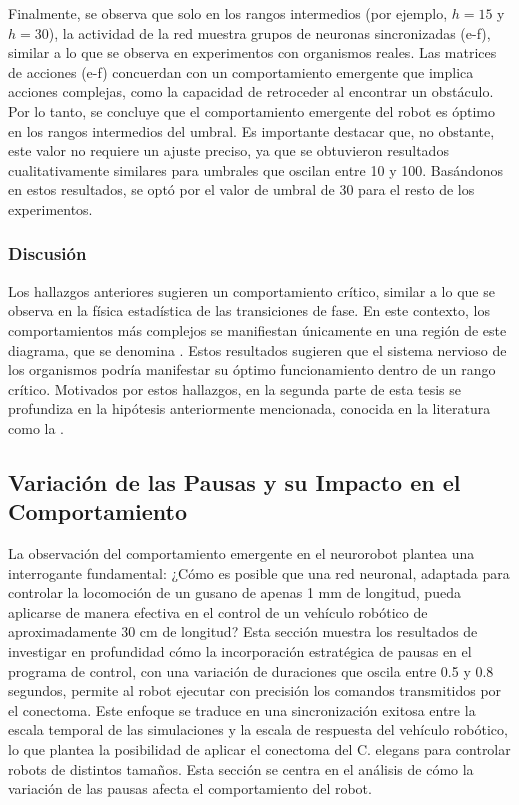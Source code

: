 Finalmente, se observa que solo en los rangos intermedios (por ejemplo, $h=15$ y $h=30$), la actividad de la red muestra grupos de neuronas sincronizadas (e-f), similar a lo que se observa en experimentos con organismos reales. Las matrices de acciones (e-f) concuerdan con un comportamiento emergente que implica acciones complejas, como la capacidad de retroceder al encontrar un obstáculo. Por lo tanto, se concluye que el comportamiento emergente del robot es óptimo en los rangos intermedios del umbral. Es importante destacar que, no obstante, este valor no requiere un ajuste preciso, ya que se obtuvieron resultados cualitativamente similares para umbrales que oscilan entre 10 y 100. Basándonos en estos resultados, se optó por el valor de umbral de 30 para el resto de los experimentos.

\subsubsection{Discusión}

Los hallazgos anteriores sugieren un comportamiento crítico, similar a lo que se observa en la física estadística de las transiciones de fase. En este contexto, los comportamientos más complejos se manifiestan únicamente en una región de este diagrama, que se denomina . Estos resultados sugieren que el sistema nervioso de los organismos podría manifestar su óptimo funcionamiento dentro de un rango crítico. Motivados por estos hallazgos, en la segunda parte de esta tesis se profundiza en la hipótesis anteriormente mencionada, conocida en la literatura como la .

\subsection{Variación de las Pausas y su Impacto en el Comportamiento}

La observación del comportamiento emergente en el neurorobot plantea una interrogante fundamental: ¿Cómo es posible que una red neuronal, adaptada para controlar la locomoción de un gusano de apenas 1 mm de longitud, pueda aplicarse de manera efectiva en el control de un vehículo robótico de aproximadamente 30 cm de longitud? Esta sección muestra los resultados de investigar en profundidad cómo la incorporación estratégica de pausas en el programa de control, con una variación de duraciones que oscila entre 0.5 y 0.8 segundos, permite al robot ejecutar con precisión los comandos transmitidos por el conectoma. Este enfoque se traduce en una sincronización exitosa entre la escala temporal de las simulaciones y la escala de respuesta del vehículo robótico, lo que plantea la posibilidad de aplicar el conectoma del C. elegans para controlar robots de distintos tamaños. Esta sección se centra en el análisis de cómo la variación de las pausas afecta el comportamiento del robot.

